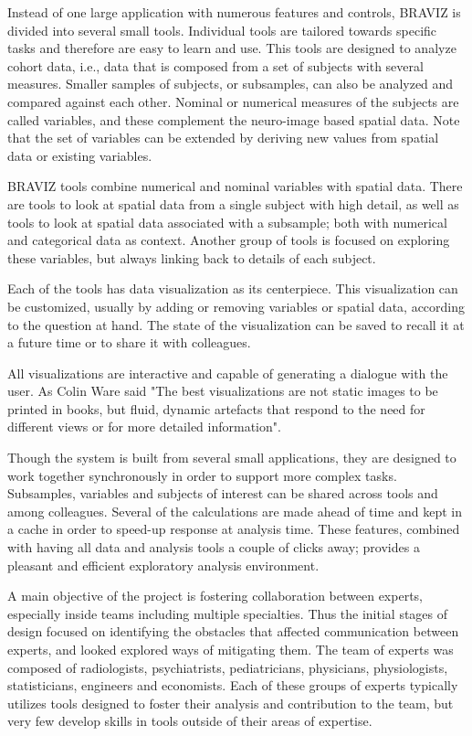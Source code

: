 \documentclass[utf8]{frontiersSCNS} %
\begin{document}
Instead of one large application with numerous features and controls, BRAVIZ is divided into several small tools. Individual tools are tailored towards specific tasks and therefore are easy to learn and use. This tools are designed to analyze cohort data, i.e., data that is composed from a set of subjects with several measures. Smaller samples of subjects, or subsamples, can also be analyzed and compared against each other. Nominal or numerical measures of the subjects are called variables, and these complement the neuro-image based spatial data. Note that the set of variables can be extended by deriving new values from spatial data or existing variables. 

BRAVIZ tools combine numerical and nominal variables with spatial data. There are tools to look at spatial data from a single subject with high detail, as well as tools to look at spatial data associated with a subsample; both with numerical and categorical data as context. Another group of tools is focused on exploring these variables, but always linking back to details of each subject.

Each of the tools has data visualization as its centerpiece. This visualization can be customized, usually by adding or removing variables or spatial data, according to the question at hand. The state of the visualization can be saved  to recall it at a future time or to share it with colleagues. 

All visualizations are interactive and capable of generating a dialogue with the user.
As Colin Ware \citep{ware_information_2004} said "The best visualizations are not static images to be printed in books, but fluid, dynamic artefacts that respond to the need for different views or for more detailed information".  

Though the system is built from several small applications, they are designed to work together synchronously in order to support more complex tasks. Subsamples, variables and subjects of interest can be shared across tools and among colleagues. 
Several of the calculations are made ahead of time and kept in a cache in order to speed-up response at analysis time. These features, combined with having all data and analysis tools a couple of clicks away; provides a pleasant and efficient exploratory analysis environment. 

A main objective of the project is fostering collaboration between experts, especially inside teams including multiple specialties. Thus the initial stages of design focused on identifying the obstacles that affected communication between experts, and looked explored ways of mitigating them. The team of experts was composed of radiologists, psychiatrists, pediatricians, physicians, physiologists, statisticians, engineers and economists. Each of these groups of experts typically utilizes tools designed to foster their analysis and contribution to the team, but very few develop skills in tools outside of their areas of expertise.
\end{document}
